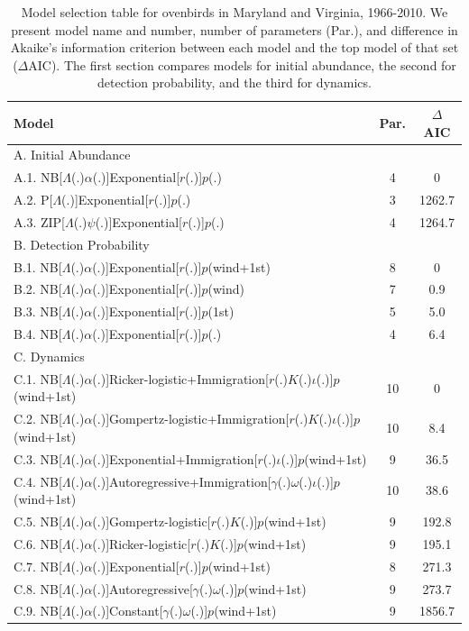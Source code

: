 \documentclass[12pt]{article}
\begin{document}
\begin{table}
  \centering
  \small
\caption{Model selection table for ovenbirds in Maryland and Virginia,
    1966-2010.  We present model name and number, number of 
parameters (Par.), and difference in Akaike's
information criterion between each model and the top model of
that set ($\Delta$AIC).  The first section compares
models for initial abundance, the second for detection
probability, and the third for dynamics.}
  \begin{tabular}[h]{lcc}
\hline
Model	&Par.	&$\Delta$AIC	\\
\hline
A. Initial Abundance && \\
A.1. NB[$\Lambda$(.)$\alpha$(.)]Exponential[$r$(.)]$p$(.)	&4	&0\\
A.2. P[$\Lambda$(.)]Exponential[$r$(.)]$p$(.)	&3	&1262.7\\
A.3. ZIP[$\Lambda$(.)$\psi$(.)]Exponential[$r$(.)]$p$(.)	&4 &1264.7\\
\hline
B. Detection Probability && \\
B.1. NB[$\Lambda$(.)$\alpha$(.)]Exponential[$r$(.)]$p$(wind+1st)	&8 &0	\\
B.2. NB[$\Lambda$(.)$\alpha$(.)]Exponential[$r$(.)]$p$(wind) &7 &0.9\\
B.3. NB[$\Lambda$(.)$\alpha$(.)]Exponential[$r$(.)]$p$(1st)	&5	&5.0
\\B.4. NB[$\Lambda$(.)$\alpha$(.)]Exponential[$r$(.)]$p$(.)	&4	&6.4\\
\hline
C. Dynamics && \\
C.1. NB[$\Lambda$(.)$\alpha$(.)]Ricker-logistic+Immigration[$r$(.)$K$(.)$\iota$(.)]$p$(wind+1st) &10	&0	\\
C.2. NB[$\Lambda$(.)$\alpha$(.)]Gompertz-logistic+Immigration[$r$(.)$K$(.)$\iota$(.)]$p$(wind+1st) &10	&8.4 \\
C.3. NB[$\Lambda$(.)$\alpha$(.)]Exponential+Immigration[$r$(.)$\iota$(.)]$p$(wind+1st) &9	&36.5\\
C.4. NB[$\Lambda$(.)$\alpha$(.)]Autoregressive+Immigration[$\gamma$(.)$\omega$(.)$\iota$(.)]$p$(wind+1st) &10	&38.6\\
C.5. NB[$\Lambda$(.)$\alpha$(.)]Gompertz-logistic[$r$(.)$K$(.)]$p$(wind+1st) &9	&192.8\\
C.6. NB[$\Lambda$(.)$\alpha$(.)]Ricker-logistic[$r$(.)$K$(.)]$p$(wind+1st) &9	&195.1\\
C.7. NB[$\Lambda$(.)$\alpha$(.)]Exponential[$r$(.)]$p$(wind+1st)	&8 &271.3\\
C.8. NB[$\Lambda$(.)$\alpha$(.)]Autoregressive[$\gamma$(.)$\omega$(.)]$p$(wind+1st) &9	&273.7\\
C.9. NB[$\Lambda$(.)$\alpha$(.)]Constant[$\gamma$(.)$\omega$(.)]$p$(wind+1st) &9	&1856.7\\
\hline
\end{tabular}
\end{table}
\end{document}
